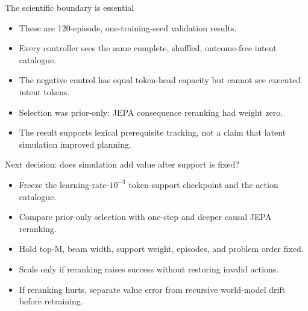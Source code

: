 \documentclass[aspectratio=169]{beamer}
\begin{document}
\begin{frame}{The scientific boundary is essential}
  \begin{itemize}
    \item These are 120-episode, one-training-seed validation results.
    \item Every controller sees the same complete, shuffled, outcome-free intent catalogue.
    \item The negative control has equal token-head capacity but cannot see executed intent tokens.
    \item Selection was prior-only: JEPA consequence reranking had weight zero.
    \item The result supports lexical prerequisite tracking, not a claim that latent simulation improved planning.
  \end{itemize}
\end{frame}

\begin{frame}{Next decision: does simulation add value after support is fixed?}
  \begin{itemize}
    \item Freeze the learning-rate-$10^{-3}$ token-support checkpoint and the action catalogue.
    \item Compare prior-only selection with one-step and deeper causal JEPA reranking.
    \item Hold top-M, beam width, support weight, episodes, and problem order fixed.
    \item Scale only if reranking raises success without restoring invalid actions.
    \item If reranking hurts, separate value error from recursive world-model drift before retraining.
  \end{itemize}
\end{frame}
\end{document}
